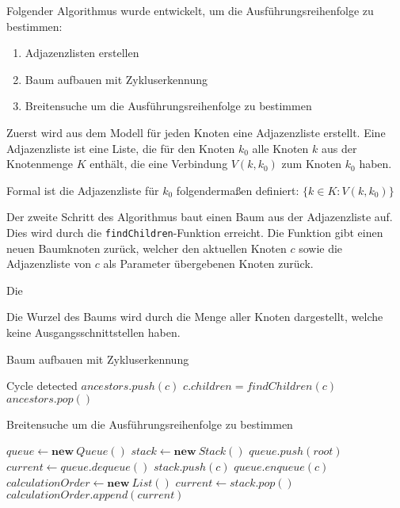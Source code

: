 Folgender Algorithmus wurde entwickelt, um die Ausführungsreihenfolge zu bestimmen:
\begin{enumerate}
    \item Adjazenzlisten erstellen
    \item Baum aufbauen mit Zykluserkennung
    \item Breitensuche um die Ausführungsreihenfolge zu bestimmen 
\end{enumerate}

Zuerst wird aus dem Modell für jeden Knoten eine Adjazenzliste erstellt. Eine Adjazenzliste ist eine Liste, die für den Knoten $k_0$ alle Knoten $k$ aus der Knotenmenge $K$ enthält, die eine Verbindung $V(k, k_0)$ zum Knoten $k_0$ haben.

Formal ist die Adjazenzliste für $k_0$ folgendermaßen definiert: $\{ k \in K : V(k, k_0) \}$

Der zweite Schritt des Algorithmus baut einen Baum aus der Adjazenzliste auf. Dies wird durch die \texttt{findChildren}-Funktion erreicht. Die Funktion gibt einen neuen Baumknoten zurück, welcher den aktuellen Knoten $c$ sowie die Adjazenzliste von $c$ als Parameter übergebenen Knoten zurück.

Die 

Die Wurzel des Baums wird durch die Menge aller Knoten dargestellt, welche keine Ausgangsschnittstellen haben.

\begin{algorithm}[H]
    \caption{Baum aufbauen mit Zykluserkennung}
    \begin{algorithmic}[1]
                    \State Cycle detected
                \EndIf
                \State $ancestors.push(c)$
                \State $c.children = findChildren(c)$
                \State {}
                \State $ancestors.pop()$
            \EndFor
        \EndFunction
    \end{algorithmic}
\end{algorithm}

\begin{algorithm}[H]
    \caption{Breitensuche um die Ausführungsreihenfolge zu bestimmen}
    \begin{algorithmic}[1]
        \State $queue \gets \textbf{new} \ Queue()$
        \State $stack \gets \textbf{new} \ Stack()$
        \State $queue.push(root)$
            \State $current \gets queue.dequeue()$
                \State $stack.push(c)$
                \State $queue.enqueue(c)$
            \EndFor
        \EndWhile
        \State $calculationOrder \gets \textbf{new} \ List()$
            \State $current \gets stack.pop()$
                \State $calculationOrder.append(current)$
            \EndIf
        \EndWhile
    \end{algorithmic}
\end{algorithm}

